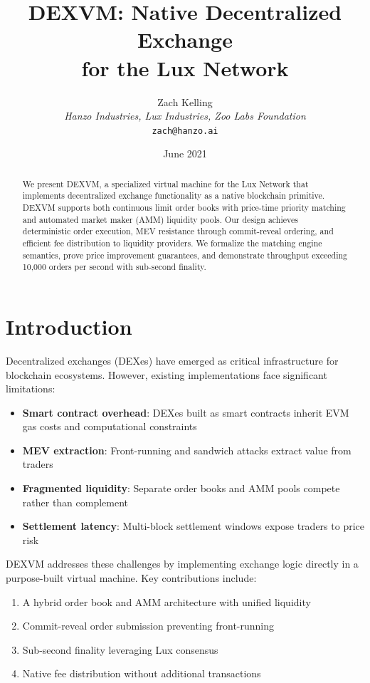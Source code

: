 \documentclass[11pt,a4paper]{article}
\title{\textbf{DEXVM: Native Decentralized Exchange\\for the Lux Network}}
\author{Zach Kelling\\
\textit{Hanzo Industries, Lux Industries, Zoo Labs Foundation}\\
\texttt{zach@hanzo.ai}}
\date{June 2021}
\theoremstyle{definition}
\begin{document}
\maketitle

\begin{abstract}
We present DEXVM, a specialized virtual machine for the Lux Network that implements decentralized exchange functionality as a native blockchain primitive. DEXVM supports both continuous limit order books with price-time priority matching and automated market maker (AMM) liquidity pools. Our design achieves deterministic order execution, MEV resistance through commit-reveal ordering, and efficient fee distribution to liquidity providers. We formalize the matching engine semantics, prove price improvement guarantees, and demonstrate throughput exceeding 10,000 orders per second with sub-second finality.
\end{abstract}

\section{Introduction}

Decentralized exchanges (DEXes) have emerged as critical infrastructure for blockchain ecosystems. However, existing implementations face significant limitations:

\begin{itemize}
    \item \textbf{Smart contract overhead}: DEXes built as smart contracts inherit EVM gas costs and computational constraints
    \item \textbf{MEV extraction}: Front-running and sandwich attacks extract value from traders
    \item \textbf{Fragmented liquidity}: Separate order books and AMM pools compete rather than complement
    \item \textbf{Settlement latency}: Multi-block settlement windows expose traders to price risk
\end{itemize}

DEXVM addresses these challenges by implementing exchange logic directly in a purpose-built virtual machine. Key contributions include:

\begin{enumerate}
    \item A hybrid order book and AMM architecture with unified liquidity
    \item Commit-reveal order submission preventing front-running
    \item Sub-second finality leveraging Lux consensus
    \item Native fee distribution without additional transactions
\end{enumerate}
\end{document}
